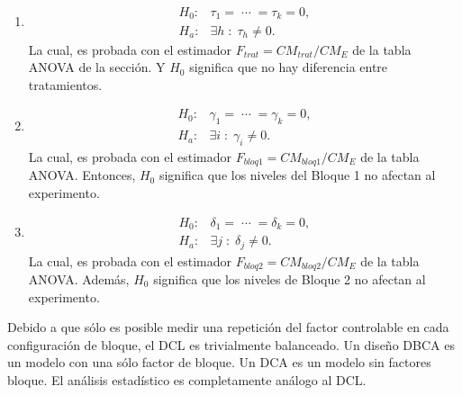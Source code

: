 \documentclass[11pt,a4paper]{article}
\begin{document}
\begin{enumerate}
	\item[\fbox{Hip. Principal}]
		\begin{equation}
			\begin{array}{rl}
				H_0 :& \tau _1 = \;\cdots\; = \tau _k = 0, \\[2mm]
				H_a: &\exists h \;:\; \tau _h \ne 0.
			\end{array}
			\label{eq:hipotesis_principal}
		\end{equation}
		La cual, es probada con el estimador \(F_{trat} = CM_{trat} / CM_E\) de la tabla ANOVA de la sección.
		Y \(H_0\) significa que no hay diferencia entre tratamientos.
	\item[\fbox{Hip. Secundaria 1}]
		\begin{equation}
			\begin{array}{rl}
				H_0 : & \gamma _1 = \;\cdots\; = \gamma _k =0, \\[2mm]
				H_a : & \exists i \;:\; \gamma _i \ne 0.
			\end{array}
			\label{eq:hipotesis_sec_1}
		\end{equation}
		La cual, es probada con el estimador \(F_{bloq1} = CM_{bloq1} / CM_E\) de la tabla ANOVA.
		Entonces, \(H_0\) significa que los niveles del Bloque 1 no afectan al experimento.
	\item[\fbox{Hip. Secundaria 2}]
		\begin{equation}
			\begin{array}{rl}
				H_0 : & \delta _1 =  \;\cdots\; = \delta _k = 0, \\[2mm]
				H_a : & \exists j \;:\; \delta _j \ne 0.
			\end{array}
			\label{eq:hipotesis_sec_2}
		\end{equation}
		La cual, es probada con el estimador \(F_{bloq2} = CM_{bloq2} / CM_E\) de la tabla ANOVA.
		Además, \(H_0\) significa que los niveles de Bloque 2 no afectan al experimento.
\end{enumerate}
Debido a que sólo es posible medir una repetición del factor controlable en cada configuración de bloque, el DCL es trivialmente balanceado.
Un diseño DBCA es un modelo con una sólo factor de bloque. Un DCA es un modelo sin factores bloque. El análisis estadístico es completamente análogo al DCL.



\newpage
\end{document}
